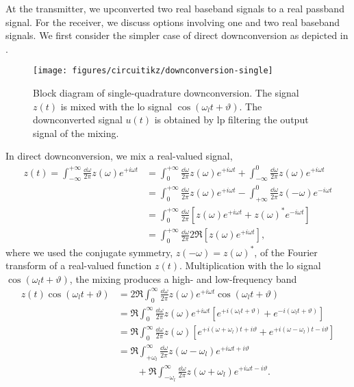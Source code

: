 At the transmitter, we upconverted two real baseband signals to a real passband signal.
For the receiver, we discuss options involving one and two real baseband signals.
We first consider the simpler case of direct downconversion as depicted in .
\begin{figure}[htb]
	\centering
	\texttt{[image: figures/circuitikz/downconversion-single]}
	\caption{Block diagram of single-quadrature downconversion. The signal $z(t)$ is mixed with the \gls{lo} signal $\cos(\omega_lt+\vartheta)$. The downconverted signal $u(t)$ is obtained by \gls{lp} filtering the output signal of the mixing.}\label{fig:downconversion_single}
\end{figure}
In direct downconversion, we mix a real-valued signal,
\begin{equation}
	\begin{split}
		z(t)
		=
		\int_{-\infty}^{+\infty}\frac{\dd{\omega}}{2\pi}
		z(\omega)
		e^{+i\omega t}
		&=
		\int_0^{+\infty}\frac{\dd{\omega}}{2\pi}
		z(\omega)
		e^{+i\omega t}
		+
		\int_{-\infty}^0\frac{\dd{\omega}}{2\pi}
		z(\omega)
		e^{+i\omega t}
		\\
		&=
		\int_0^{+\infty}\frac{\dd{\omega}}{2\pi}
		z(\omega)
		e^{+i\omega t}
		-
		\int_{+\infty}^0\frac{\dd{\omega}}{2\pi}
		z(-\omega)
		e^{-i\omega t}
		\\
		&=
		\int_0^{+\infty}\frac{\dd{\omega}}{2\pi}
		\left[
			z(\omega)
			e^{+i\omega t}
			+
			z(\omega)^*
			e^{-i\omega t}
		\right]
		\\
		&=
		\int_0^{+\infty}\frac{\dd{\omega}}{2\pi}
		2\Re\left[
			z(\omega)
			e^{+i\omega t}
		\right]
		,
	\end{split}
\end{equation}
where we used the conjugate symmetry, $z(-\omega)=z(\omega)^*$, of the Fourier transform of a real-valued function $z(t)$.
Multiplication with the \gls{lo} signal $\cos(\omega_lt+\vartheta)$, the mixing produces a high- and low-frequency band
\begin{equation}
	\begin{split}
		z(t)
		\cos(\omega_lt+\vartheta)
		&=
		2\Re
		\int_0^\infty\frac{\dd{\omega}}{2\pi}
		z(\omega)
		e^{+i\omega t}
		\cos(\omega_lt+\vartheta)
		\\
		&=
		\Re
		\int_0^\infty\frac{\dd{\omega}}{2\pi}
		z(\omega)
		e^{+i\omega t}
		\left[
			e^{+i(\omega_lt+\vartheta)}
			+
			e^{-i(\omega_lt+\vartheta)}
		\right]
		\\
		&=
		\Re
		\int_0^\infty\frac{\dd{\omega}}{2\pi}
		z(\omega)
		\left[
			e^{+i(\omega+\omega_l)t+i\vartheta}
			+
			e^{+i(\omega-\omega_l)t-i\vartheta}
		\right]
		\\
		&=
		\Re
		\int_{+\omega_l}^\infty\frac{\dd{\omega}}{2\pi}
		z(\omega-\omega_l)
		e^{+i\omega t+i\vartheta}
		\\
		&\qquad+
		\Re
		\int_{-\omega_l}^\infty\frac{\dd{\omega}}{2\pi}
		z(\omega+\omega_l)
		e^{+i\omega t-i\vartheta}
		.
	\end{split}
\end{equation}
